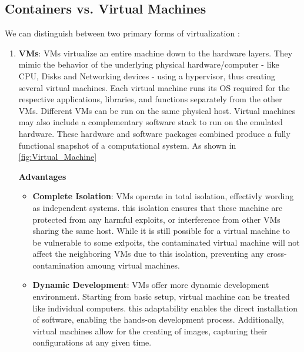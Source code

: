 \subsection{Containers vs. Virtual Machines}
We can distinguish between two primary forms of virtualization \cite{CON_VMS, CON_VMS_Atlassien, CON_VMS_ENGINE_YARD}:
\begin{enumerate}
    \item \textbf{\ac{VMs}}: \ac{VMs} virtualize an entire machine down to the hardware layers. They mimic the behavior of the underlying physical hardware/computer - like CPU, Disks and Networking devices - using a hypervisor, thus creating several virtual machines. Each virtual machine runs its \ac{OS} required for the respective applications, libraries, and functions separately from the other \ac{VMs}. Different \ac{VMs} can be run on the same physical host. Virtual machines may also include a complementary software stack to run on the emulated hardware. These hardware and software packages combined produce a fully functional snapshot of a computational system. As shown in \autoref{fig:Virtual_Machine}
          
          \newline
          \textbf{Advantages}
          \begin{itemize}
              \item \textbf{Complete Isolation}: \ac{VMs} operate in total isolation, effectivly wording as independent systems. this isolation ensures that these machine are protected from any harmful exploits, or interference from other \ac{VMs} sharing the same host. While it is still possible for a virtual machine to be vulnerable to some exlpoits, the contaminated virtual machine will not affect the neighboring \ac{VMs} due to this isolation, preventing any cross-contamination amoung virtual machines.
              \item \textbf{Dynamic Development}: \ac{VMs} offer more dynamic development environment. Starting from basic setup, virtual machine can be treated like individual computers. this adaptability enables the direct installation of software, enabling the hands-on development process. Additionally, virtual machines allow for the creating of images, capturing their configurations at any given time.
          \end{itemize}


\end{enumerate}
